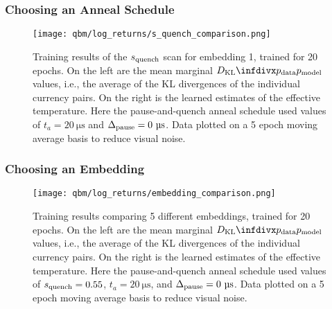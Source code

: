 \subsubsection{Choosing an Anneal Schedule}
\begin{figure}[!htb]
    \begin{center}
        \texttt{[image: qbm/log\_returns/s\_quench\_comparison.png]}
    \end{center}
    \caption{
        Training results of the \( s_{\text{quench}} \) scan for embedding 1, trained for 20 epochs.
        On the left are the mean marginal \( \DKL{\pdata}{\pmodel} \) values, i.e., the average of the KL divergences of the individual currency pairs.
        On the right is the learned estimates of the effective temperature.
        Here the pause-and-quench anneal schedule used values of \( t_a = 20 \ \si{\micro\second} \) and \( \Deltapause = 0 \ \si{\micro\second} \).
        Data plotted on a 5 epoch moving average basis to reduce visual noise.
    }
    \label{fig:qbm_log_returns_s_quench_comparison}
\end{figure}

\subsubsection{Choosing an Embedding}
\begin{figure}[!htb]
    \begin{center}
        \texttt{[image: qbm/log\_returns/embedding\_comparison.png]}
    \end{center}
    \caption{
        Training results comparing 5 different embeddings, trained for 20 epochs.
        On the left are the mean marginal \( \DKL{\pdata}{\pmodel} \) values, i.e., the average of the KL divergences of the individual currency pairs.
        On the right is the learned estimates of the effective temperature.
        Here the pause-and-quench anneal schedule used values of \( s_{\text{quench}} = 0.55 \), \( t_a = 20 \ \si{\micro\second} \), and \( \Deltapause = 0 \ \si{\micro\second} \).
        Data plotted on a 5 epoch moving average basis to reduce visual noise.
    }
    \label{fig:qbm_log_returns_embedding_comparison}
\end{figure}

